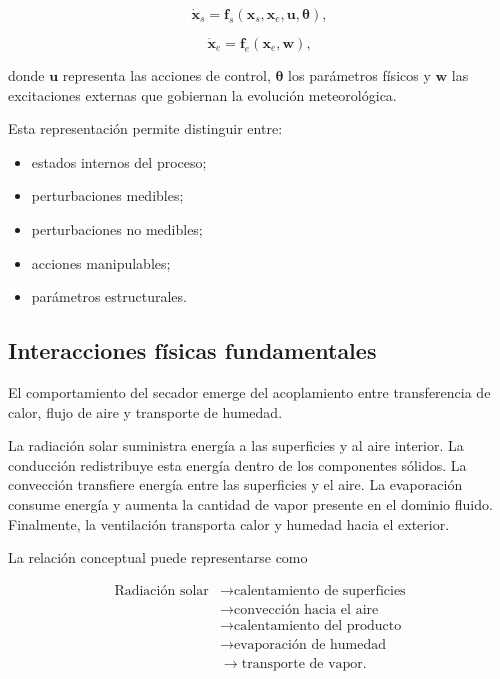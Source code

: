 \begin{equation}
\dot{\mathbf{x}}_s
=
\mathbf{f}_s
\left(
\mathbf{x}_s,
\mathbf{x}_e,
\mathbf{u},
\boldsymbol{\theta}
\right),
\label{eq:dinamica_sistema}
\end{equation}

\begin{equation}
\dot{\mathbf{x}}_e
=
\mathbf{f}_e
\left(
\mathbf{x}_e,
\mathbf{w}
\right),
\label{eq:dinamica_entorno}
\end{equation}

donde $\mathbf{u}$ representa las acciones de control, $\boldsymbol{\theta}$ los parámetros físicos y $\mathbf{w}$ las excitaciones externas que gobiernan la evolución meteorológica.

Esta representación permite distinguir entre:

\begin{itemize}
    \item estados internos del proceso;
    \item perturbaciones medibles;
    \item perturbaciones no medibles;
    \item acciones manipulables;
    \item parámetros estructurales.
\end{itemize}

\subsection{Interacciones físicas fundamentales}
\label{subsec:interacciones_fundamentales}

El comportamiento del secador emerge del acoplamiento entre transferencia de calor, flujo de aire y transporte de humedad.

La radiación solar suministra energía a las superficies y al aire interior. La conducción redistribuye esta energía dentro de los componentes sólidos. La convección transfiere energía entre las superficies y el aire. La evaporación consume energía y aumenta la cantidad de vapor presente en el dominio fluido. Finalmente, la ventilación transporta calor y humedad hacia el exterior.

La relación conceptual puede representarse como

\begin{equation}
\boxed{
\begin{aligned}
\text{Radiación solar}
&\longrightarrow
\text{calentamiento de superficies}
\\
&\longrightarrow
\text{convección hacia el aire}
\\
&\longrightarrow
\text{calentamiento del producto}
\\
&\longrightarrow
\text{evaporación de humedad}
\\
&\longrightarrow
\text{transporte de vapor}.
\end{aligned}
}
\label{eq:cadena_fisica_secado}
\end{equation}

